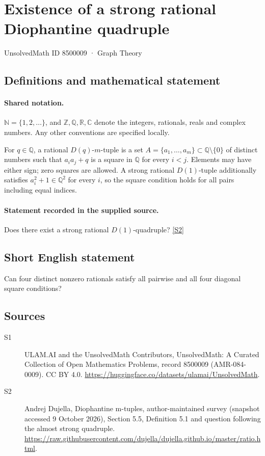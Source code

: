 \documentclass[11pt]{article}
\newcommand{\sref}[2]{\hyperlink{source:#1:#2}{[S#2]}}
\begin{document}
\setcounter{section}{8500008}
\section{Existence of a strong rational Diophantine quadruple}\label{8500009}
{\small\sffamily UnsolvedMath ID 8500009 · Graph Theory}
\subsection{Definitions and mathematical statement}

\paragraph{Shared notation.}$\mathbb N=\{1,2,\ldots\}$, and $\mathbb Z,\mathbb Q,\mathbb R,\mathbb C$ denote the integers, rationals, reals and complex numbers. Any other conventions are specified locally.


For $q\in\mathbb Q$, a rational $D(q)$-$m$-tuple is a set $A=\{a_1,\ldots,a_m\}\subset\mathbb Q\setminus\{0\}$ of distinct numbers such that $a_i a_j+q$ is a square in $\mathbb Q$ for every $i<j$. Elements may have either sign; zero squares are allowed. A strong rational $D(1)$-tuple additionally satisfies $a_i^2+1\in\mathbb Q^2$ for every $i$, so the square condition holds for all pairs including equal indices.
\paragraph{Statement recorded in the supplied source.}
Does there exist a strong rational $D(1)$-quadruple? \sref{8500009}{2}
\subsection{Short English statement}
Can four distinct nonzero rationals satisfy all pairwise and all four diagonal square conditions?
\subsection{Sources}
\begin{description}
\item[\hypertarget{source:8500009:1}{S1}] ULAM.AI and the UnsolvedMath Contributors, UnsolvedMath: A Curated Collection of Open Mathematics Problems, record 8500009 (AMR-084-0009). CC BY 4.0. \url{https://huggingface.co/datasets/ulamai/UnsolvedMath}.
\item[\hypertarget{source:8500009:2}{S2}] Andrej Dujella, Diophantine m-tuples, author-maintained survey (snapshot accessed 9 October 2026), Section 5.5, Definition 5.1 and question following the almost strong quadruple. \url{https://raw.githubusercontent.com/dujella/dujella.github.io/master/ratio.html}.
\end{description}
\label{end:8500009}
\end{document}
